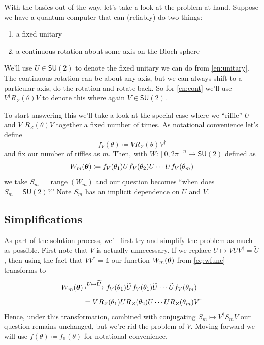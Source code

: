 \documentclass[12pt,dvipsnames]{article}
\newcommand{\SU}[1]{\mathsf{SU} (#1)}
\newcommand{\1}{\mathbb{1}}
\DeclareMathOperator{\range}{range}
\theoremstyle{plain}
\begin{document}
With the basics out of the way, let's take a look at the problem at hand.
Suppose we have a quantum computer that can (reliably) do two things:
\begin{enumerate}
    \item a fixed unitary\label{en:unitary}
    \item a continuous rotation about some axis on the Bloch sphere\label{en:cont}
\end{enumerate}
We'll use $U\in \SU{2}$ to denote the fixed unitary we can do from \cref{en:unitary}. The continuous rotation can be about any axis, but we can always shift to a particular axis, do the rotation and rotate back. So for \cref{en:cont} we'll use $V^\dagger R_Z(\theta)V$ to denote this where again $V\in \SU{2}$.

To start answering this we'll take a look at the special case where we ``riffle'' $U$ and $V^\dagger R_Z(\theta)V$ together a fixed number of times. As notational convenience let's define
\begin{equation}
    f_V(\theta)\coloneqq VR_Z(\theta)V^\dagger
\end{equation}
and fix our number of riffles as $m$. Then, with $W:[0, 2\pi]^n\to\SU{2}$ defined as
\begin{equation}\label{eq:wfunc}
    W_m(\vb*{\theta}) \coloneqq f_V(\theta_1)Uf_V(\theta_2)U\cdots U f_V(\theta_m)
\end{equation}
we take $S_m = \range(W_m)$ and our question becomes ``when does $S_{m} = \SU{2}$?'' Note $S_m$ has an implicit dependence on $U$ and $V$.

\subsection{Simplifications}

As part of the solution process, we'll first try and simplify the problem as much as possible. First note that $V$ is actually unnecessary. If we replace $U\mapsto VUV^\dagger = \widetilde{U}$, then using the fact that $VV^\dagger = \1$ our function $W_m(\vb*{\theta})$ from \cref{eq:wfunc} transforms to
\begin{align*}
    W_m(\vb*{\theta}) & \xmapsto{U\mapsto \widetilde{U}} f_V(\theta_1)\widetilde{U}f_V(\theta_1)\widetilde{U}\cdots \widetilde{U}f_V(\theta_m) \\[0.4em]
                      & = VR_Z(\theta_1)U R_Z(\theta_2) U \cdots U R_Z(\theta_m)V^\dagger
\end{align*}
Hence, under this transformation, combined with conjugating $S_m\mapsto V^\dagger S_m V$ our question remains unchanged, but we're rid the problem of $V$. Moving forward we will use $f(\theta)\coloneqq f_\1(\theta)$ for notational convenience.
\end{document}
